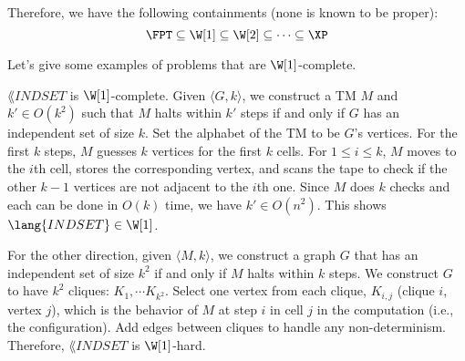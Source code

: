 Therefore, we have the following containments (none is known to be proper):
\[
\FPT \subseteq \W[1] \subseteq \W[2] \subseteq \cdots \subseteq \XP
\]

Let's give some examples of problems that are $\W[1]$-complete. 

\begin{example}
$\lang{INDSET}$ is $\W[1]$-complete. Given $\langle G, k\rangle$, we construct a TM $M$ and $k' \in O(k^2)$ such that $M$ halts within $k'$ steps if and only if $G$ has an independent set of size $k$. Set the alphabet of the TM to be $G$'s vertices. For the first $k$ steps, $M$ guesses $k$ vertices for the first $k$ cells. For $1 \le i \le k$, $M$ moves to the $i$th cell, stores the corresponding vertex, and scans the tape to check if the other $k-1$ vertices are not adjacent to the $i$th one. Since $M$ does $k$ checks and each can be done in $O(k)$ time, we have $k' \in O(n^2)$. This shows $\lang{INDSET} \in \W[1]$.

\par For the other direction, given $\langle M, k\rangle$, we construct a graph $G$ that has an independent set of size $k^2$ if and only if $M$ halts within $k$ steps. We construct $G$ to have $k^2$ cliques: $K_1, \cdots K_{k^2}$. Select one vertex from each clique, $K_{i, j}$ (clique $i$, vertex $j$), which is the behavior of $M$ at step $i$ in cell $j$ in the computation (i.e., the configuration). Add edges between cliques to handle any non-determinism. Therefore, $\lang{INDSET}$ is $\W[1]$-hard. 
%
\end{example}